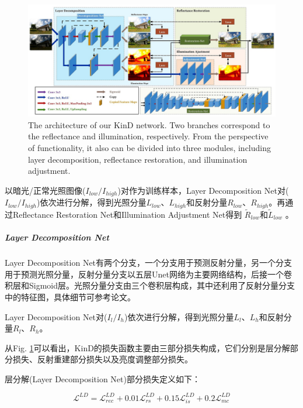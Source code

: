 \documentclass[letterpaper,12pt]{article}
\begin{document}
	\begin{figure}[htbp]
		\centering \includegraphics[width=0.8\columnwidth]{network}
		\captionsetup{font=scriptsize}
		\caption{
			\label{fig: network} %
			The architecture of our KinD network. Two branches correspond to the reflectance and illumination, respectively. From the perspective of functionality, it also can be divided into three modules, including layer decomposition, reflectance restoration, and illumination adjustment.
		}
	\end{figure}
	
	以暗光/正常光照图像($I_{low}/I_{high}$)对作为训练样本，Layer Decomposition Net对($I_{low}/I_{high}$)依次进行分解，得到光照分量$L_{low}$、$L_{high}$和反射分量$R_{low}$、$R_{high}$。再通过Reflectance Restoration Net和Illumination Adjustment Net得到
	$\tilde{R}_{low}$和$\tilde{L}_{low}$
	。
	
	\subparagraph{Layer Decomposition Net}
	
	Layer Decomposition Net有两个分支，一个分支用于预测反射分量，另一个分支用于预测光照分量，反射分量分支以五层Unet网络为主要网络结构，后接一个卷积层和Sigmoid层。光照分量分支由三个卷积层构成，其中还利用了反射分量分支中的特征图，具体细节可参考论文。
	
	Layer Decomposition Net对($I_l / I_h$)依次进行分解，得到光照分量$L_l$、$L_h$和反射分量$R_l$、$R_h$。
	
	从Fig. \ref{fig: network}可以看出，KinD的损失函数主要由三部分损失构成，它们分别是层分解部分损失、反射重建部分损失以及亮度调整部分损失。
	
	层分解(Layer Decomposition Net)部分损失定义如下：
	
	\begin{equation}
		\mathcal{L}^{LD}=\mathcal{L}_{rec}^{LD}+0.01\mathcal{L}_{rs}^{LD}+0.15\mathcal{L}_{is}^{LD}+0.2\mathcal{L}_{mc}^{LD}
	\end{equation}
	
\end{document}
